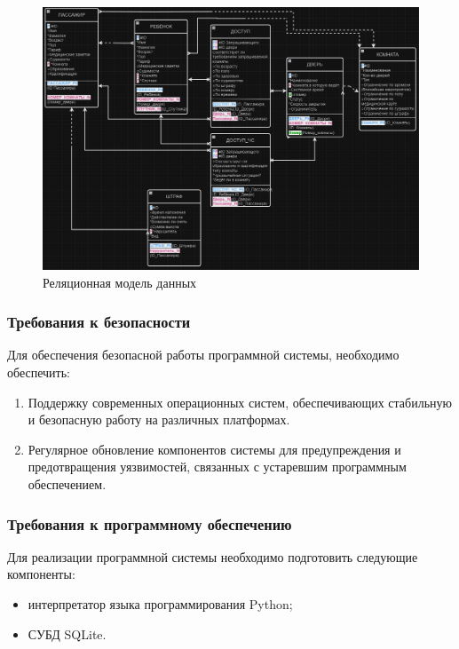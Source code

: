 \begin{figure}[H]
	\centering
	\includegraphics[width=1.0\linewidth]{images/CommonScheme3}
	\caption{Реляционная модель данных}
	\label{fig:commonscheme3}
\end{figure}

\subsubsection{Требования к безопасности}
Для обеспечения безопасной работы программной системы, необходимо обеспечить:

\begin{enumerate}
	\item Поддержку современных операционных систем, обеспечивающих стабильную и безопасную работу на различных платформах.
	\item Регулярное обновление компонентов системы для предупреждения и предотвращения уязвимостей, связанных с устаревшим программным обеспечением.
\end{enumerate}

\subsubsection{Требования к программному обеспечению}

Для реализации программной системы необходимо подготовить следующие компоненты:
\begin{itemize}
	\item интерпретатор языка программирования Python;
	\item СУБД SQLite.
\end{itemize}

